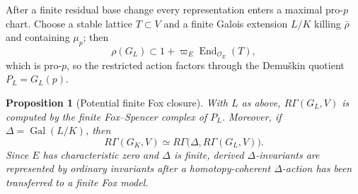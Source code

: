 \documentclass[11pt]{article}
\newtheorem{proposition}[theorem]{Proposition}
\theoremstyle{definition}
\newcommand{\End}{\operatorname{End}}
\newcommand{\Gal}{\operatorname{Gal}}
\begin{document}
After a finite residual base change every representation enters a maximal pro-$p$ chart.  Choose a stable lattice $T\subset V$ and a finite Galois extension $L/K$ killing $\bar\rho$ and containing $\mu_p$; then
\[
\rho(G_L)\subset 1+\varpi_E\End_{\mathcal O_E}(T),
\]
which is pro-$p$, so the restricted action factors through the Demu\v{s}kin quotient $P_L=G_L(p)$.

\begin{proposition}[Potential finite Fox closure]\label{prop:potential-fox-closure}
With $L$ as above, $R\Gamma(G_L,V)$ is computed by the finite Fox--Spencer complex of $P_L$.  Moreover, if $\Delta=\Gal(L/K)$, then
\[
R\Gamma(G_K,V)
\simeq
R\Gamma\bigl(\Delta,R\Gamma(G_L,V)\bigr).
\]
Since $E$ has characteristic zero and $\Delta$ is finite, derived $\Delta$-invariants are represented by ordinary invariants after a homotopy-coherent $\Delta$-action has been transferred to a finite Fox model.
\end{proposition}
\end{document}
